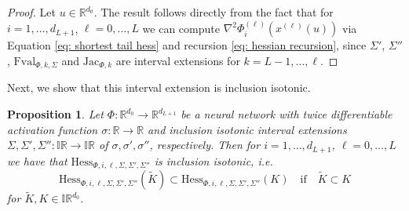 \documentclass[a4paper, 11pt]{article}
\newtheorem{proposition}[theorem]{Proposition}
\begin{document}
	\begin{proof}
		Let $u \in \mathbb{R}^{d_0}$. The result follows directly from the fact that for $i=1, \dotsc, d_{L+1}$, $\ell=0, \dotsc, L$ we can compute $\nabla^2 \Phi_i^{(\ell)}(x^{(\ell)}(u))$ via Equation \eqref{eq: shortest tail hess} and recursion \eqref{eq: hessian recursion}, since $\Sigma'$, $\Sigma''$, $\mathrm{Fval}_{\Phi,k,\Sigma}$ and $\mathrm{Jac}_{\Phi,k}$ are interval extensions for $k=L-1, \dotsc, \ell$.
	\end{proof}
	
	
	Next, we show that this interval extension is inclusion isotonic.
	
	\begin{proposition}\label{prop: hess inclusion isotonic}
		Let $\Phi : \mathbb{R}^{d_0} \to \mathbb{R}^{d_{L+1}}$ be a neural network with twice differentiable activation function $\sigma : \mathbb{R} \to \mathbb{R}$ and inclusion isotonic interval extensions $\Sigma,\Sigma',\Sigma'':\mathbb{IR}\to \mathbb{IR}$ of $\sigma,\sigma', \sigma''$, respectively. Then for $i=1, \dotsc, d_{L+1}$, $\ell=0,\dotsc, L$ we have that $\mathrm{Hess}_{\Phi,i,\ell, \Sigma, \Sigma', \Sigma''}$ is inclusion isotonic, i.e.
		\begin{equation}
			\mathrm{Hess}_{\Phi,i,\ell, \Sigma, \Sigma', \Sigma''}(\tilde{K}) \subset \mathrm{Hess}_{\Phi,i,\ell, \Sigma, \Sigma', \Sigma''}(K) \quad \text{if}\quad \tilde{K} \subset K
		\end{equation}
		for $\tilde{K},K \in \mathbb{IR}^{d_0}$.
	\end{proposition}
\end{document}
